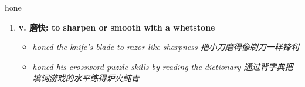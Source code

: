 
\begin{frame}
{\huge hone}
\begin{center}
\begin{enumerate}\Large
  \item \textbf{v. 磨快: to sharpen or smooth with a whetstone}
  \begin{itemize}
    \item \em{\Large{honed the knife's blade to razor-like sharpness 把小刀磨得像剃刀一样锋利}}
    \item \em{\Large{honed his crossword-puzzle skills by reading the dictionary 通过背字典把填词游戏的水平练得炉火纯青}}
  \end{itemize}
\end{enumerate}
\end{center}
\end{frame}
